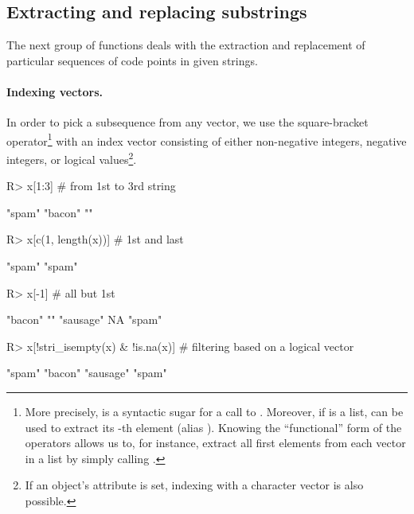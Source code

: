 \documentclass[nojss]{jss}
\begin{document}
\subsection{Extracting and replacing substrings}

The next group of functions deals with the extraction and replacement
of particular sequences of code points in given strings.

\paragraph{Indexing vectors.}
In order to pick a subsequence from any  vector,
we use the square-bracket operator\footnote{More precisely, 
is a syntactic sugar for a call to \code{`[`(x, i)}.
Moreover, if  is a list,  can be used to
extract its -th element (alias \code{`[[`(x, i)}).
Knowing the ``functional'' form of the operators allows us to, for instance,
extract all first elements from each vector in a list
by simply calling \code{sapply(x, "[[", 1)}.}
with an index vector consisting of either
non-negative integers, negative integers,
or logical values\footnote{If an object's  attribute is set,
indexing with a character vector is also possible.}.

\begin{Schunk}
\begin{Sinput}
R> x[1:3] # from 1st to 3rd string
\end{Sinput}
\begin{Soutput}
[1] "spam"  "bacon" ""
\end{Soutput}
\begin{Sinput}
R> x[c(1, length(x))] # 1st and last
\end{Sinput}
\begin{Soutput}
[1] "spam" "spam"
\end{Soutput}
\begin{Sinput}
R> x[-1]  # all but 1st
\end{Sinput}
\begin{Soutput}
[1] "bacon"   ""        "sausage" NA        "spam"
\end{Soutput}
\begin{Sinput}
R> x[!stri_isempty(x) & !is.na(x)] # filtering based on a logical vector
\end{Sinput}
\begin{Soutput}
[1] "spam"    "bacon"   "sausage" "spam"
\end{Soutput}
\end{Schunk}
\end{document}

